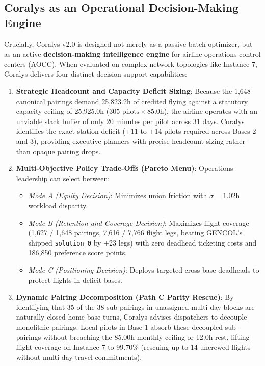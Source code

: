 \documentclass[journal]{IEEEtran}
\begin{document}
\subsection{Coralys as an Operational Decision-Making Engine}

Crucially, Coralys v2.0 is designed not merely as a passive batch optimizer, but as an active \textbf{decision-making intelligence engine} for airline operations control centers (AOCC). When evaluated on complex network topologies like Instance 7, Coralys delivers four distinct decision-support capabilities:

\begin{enumerate}
    \item \textbf{Strategic Headcount and Capacity Deficit Sizing}: Because the 1,648 canonical pairings demand 25,823.2h of credited flying against a statutory capacity ceiling of 25,925.0h ($305 \text{ pilots} \times 85.0\text{h}$), the airline operates with an unviable slack buffer of only 20 minutes per pilot across 31 days. Coralys identifies the exact station deficit (+11 to +14 pilots required across Bases 2 and 3), providing executive planners with precise headcount sizing rather than opaque pairing drops.
    \item \textbf{Multi-Objective Policy Trade-Offs (Pareto Menu)}: Operations leadership can select between:
    \begin{itemize}
        \item \emph{Mode A (Equity Decision)}: Minimizes union friction with $\sigma = 1.02$h workload disparity.
        \item \emph{Mode B (Retention and Coverage Decision)}: Maximizes flight coverage (1,627 / 1,648 pairings, 7,616 / 7,766 flight legs, beating GENCOL's shipped \texttt{solution\_0} by +23 legs) with zero deadhead ticketing costs and 186,850 preference score points.
        \item \emph{Mode C (Positioning Decision)}: Deploys targeted cross-base deadheads to protect flights in deficit bases.
    \end{itemize}
    \item \textbf{Dynamic Pairing Decomposition (Path C Parity Rescue)}: By identifying that 35 of the 38 sub-pairings in unassigned multi-day blocks are naturally closed home-base turns, Coralys advises dispatchers to decouple monolithic pairings. Local pilots in Base 1 absorb these decoupled sub-pairings without breaching the 85.00h monthly ceiling or 12.0h rest, lifting flight coverage on Instance 7 to 99.70\% (rescuing up to 14 uncrewed flights without multi-day travel commitments).

\end{enumerate}
\end{document}
